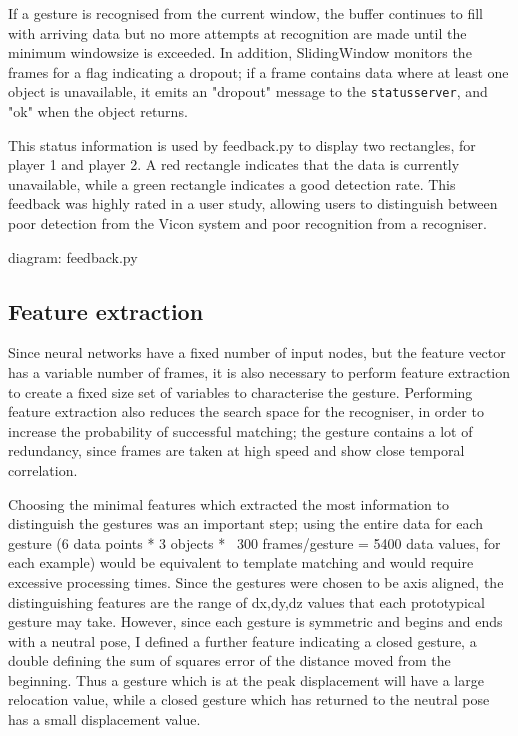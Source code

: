 \documentclass[12pt,a4,notitlepage]{report}
\renewcommand{\_}{\texttt{\symbol{95}}}
\newcommand{\<}{\texttt{\symbol{60}}}
\renewcommand{\>}{\texttt{\symbol{62}}}
\newcommand{\variable}[1]{\texttt{#1}}
\begin{document}
If a gesture is recognised from the current window, the buffer continues to fill with arriving data but no more attempts at recognition are made until the minimum windowsize is exceeded. In addition, SlidingWindow monitors the frames for a flag indicating a dropout; if a frame contains data where at least one object is unavailable, it emits an "dropout" message to the \variable{statusserver}, and "ok" when the object returns.

This status information is used by feedback.py to display two rectangles, for player 1 and player 2. A red rectangle indicates that the data is currently unavailable, while a green rectangle indicates a good detection rate. This feedback was highly rated in a user study, allowing users to distinguish between poor detection from the Vicon system and poor recognition from a recogniser.

{diagram: feedback.py}

\subsection{Feature extraction}

Since neural networks have a fixed number of input nodes, but the feature vector has a variable number of frames, it is also necessary to perform feature extraction to create a fixed size set of variables to characterise the gesture. Performing feature extraction also reduces the search space for the recogniser, in order to increase the probability of successful matching; the gesture contains a lot of redundancy, since frames are taken at high speed and show close temporal correlation.

Choosing the minimal features which extracted the most information to distinguish the gestures was an important step; using the entire data for each gesture (6 data points * 3 objects * ~300 frames/gesture = 5400 data values, for each example) would be equivalent to template matching and would require excessive processing times. Since the gestures were chosen to be axis aligned, the distinguishing features are the range of dx,dy,dz values that each prototypical gesture may take. However, since each gesture is symmetric and begins and ends with a neutral pose, I defined a further feature indicating a closed gesture, a double defining the sum of squares error of the distance moved from the beginning. Thus a gesture which is at the peak displacement will have a large relocation value, while a closed gesture which has returned to the neutral pose has a small displacement value.
\end{document}
